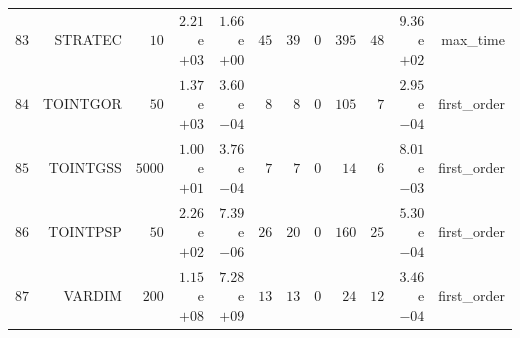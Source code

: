 \begin{longtable}{rrrrrrrrrrrr}
  \(    83\) & STRATEC & \(    10\) & \( 2.21\)e\(+03\) & \( 1.66\)e\(+00\) & \(    45\) & \(    39\) & \(     0\) & \(   395\) & \(    48\) & \( 9.36\)e\(+02\) & max\_time \\
  \(    84\) & TOINTGOR & \(    50\) & \( 1.37\)e\(+03\) & \( 3.60\)e\(-04\) & \(     8\) & \(     8\) & \(     0\) & \(   105\) & \(     7\) & \( 2.95\)e\(-04\) & first\_order \\
  \(    85\) & TOINTGSS & \(  5000\) & \( 1.00\)e\(+01\) & \( 3.76\)e\(-04\) & \(     7\) & \(     7\) & \(     0\) & \(    14\) & \(     6\) & \( 8.01\)e\(-03\) & first\_order \\
  \(    86\) & TOINTPSP & \(    50\) & \( 2.26\)e\(+02\) & \( 7.39\)e\(-06\) & \(    26\) & \(    20\) & \(     0\) & \(   160\) & \(    25\) & \( 5.30\)e\(-04\) & first\_order \\
  \(    87\) & VARDIM & \(   200\) & \( 1.15\)e\(+08\) & \( 7.28\)e\(+09\) & \(    13\) & \(    13\) & \(     0\) & \(    24\) & \(    12\) & \( 3.46\)e\(-04\) & first\_order \\\hline
\end{longtable}

